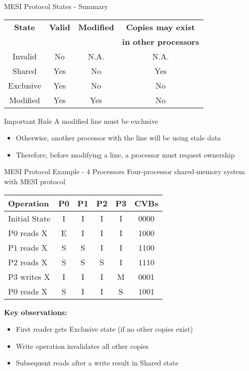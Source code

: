 \documentclass[aspectratio=169,12pt]{beamer}
\begin{document}
\begin{frame}{MESI Protocol States - Summary}
\begin{table}[h]
\centering
\begin{tabular}{|c|c|c|c|}
\hline
\rowcolor{blue!20}
\textbf{State} & \textbf{Valid} & \textbf{Modified} & \textbf{Copies may exist} \\
& & & \textbf{in other processors} \\
\hline
Invalid & No & N.A. & N.A. \\
\hline
Shared & Yes & No & Yes \\
\hline
Exclusive & Yes & No & No \\
\hline
Modified & Yes & Yes & No \\
\hline
\end{tabular}
\end{table}

\vspace{1em}
\begin{block}{Important Rule}
A modified line must be exclusive
\begin{itemize}
\item Otherwise, another processor with the line will be using stale data
\item Therefore, before modifying a line, a processor must request ownership
\end{itemize}
\end{block}
\end{frame}

\begin{frame}{MESI Protocol Example - 4 Processors}
\small
Four-processor shared-memory system with MESI protocol

\begin{table}[h]
\centering
\begin{tabular}{|l|c|c|c|c|c|}
\hline
\rowcolor{blue!20}
\textbf{Operation} & \textbf{P0} & \textbf{P1} & \textbf{P2} & \textbf{P3} & \textbf{CVBs} \\
\hline
Initial State & I & I & I & I & 0000 \\
\hline
P0 reads X & E & I & I & I & 1000 \\
\hline
P1 reads X & S & S & I & I & 1100 \\
\hline
P2 reads X & S & S & S & I & 1110 \\
\hline
P3 writes X & I & I & I & M & 0001 \\
\hline
P0 reads X & S & I & I & S & 1001 \\
\hline
\end{tabular}
\end{table}

\textbf{Key observations:}
\begin{itemize}
\item First reader gets Exclusive state (if no other copies exist)
\item Write operation invalidates all other copies
\item Subsequent reads after a write result in Shared state
\end{itemize}
\end{frame}
\end{document}
